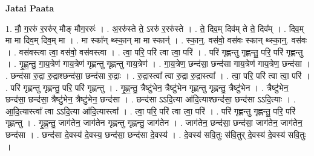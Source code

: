 \documentclass[17pt]{extarticle}
\begin{document}
\textbf{Jatai Paata} \newline

1. मौ॒ ग॒ररु॑ र॒ररु॑र् मौङ् मौग॒ररुः॑ । . अ॒ररु॑स्ते ते॒ ऽररु॑ र॒ररु॑स्ते । . ते॒ दिव॒म् दिव॑म् ते ते॒ दिव᳚म् । . दिव॒म् मा मा दिव॒म् दिव॒म् मा । . मा स्का᳚न् थ्स्का॒न् मा मा स्कान्॑ । . स्का॒न्॒. वस॑वो॒ वस॑वः स्कान् थ्स्का॒न्॒. वस॑वः । . वस॑वस्त्वा त्वा॒ वस॑वो॒ वस॑वस्त्वा । . त्वा॒ परि॒ परि॑ त्वा त्वा॒ परि॑ । . परि॑ गृह्णन्तु गृह्णन्तु॒ परि॒ परि॑ गृह्णन्तु । . गृ॒ह्ण॒न्तु॒ गा॒य॒त्रेण॑ गाय॒त्रेण॑ गृह्णन्तु गृह्णन्तु गाय॒त्रेण॑ । . गा॒य॒त्रेण॒ छन्द॑सा॒ छन्द॑सा गाय॒त्रेण॑ गाय॒त्रेण॒ छन्द॑सा । . छन्द॑सा रु॒द्रा रु॒द्राश्छन्द॑सा॒ छन्द॑सा रु॒द्राः । . रु॒द्रास्त्वा᳚ त्वा रु॒द्रा रु॒द्रास्त्वा᳚ । . त्वा॒ परि॒ परि॑ त्वा त्वा॒ परि॑ । . परि॑ गृह्णन्तु गृह्णन्तु॒ परि॒ परि॑ गृह्णन्तु । . गृ॒ह्ण॒न्तु॒ त्रैष्टु॑भेन॒ त्रैष्टु॑भेन गृह्णन्तु गृह्णन्तु॒ त्रैष्टु॑भेन । . त्रैष्टु॑भेन॒ छन्द॑सा॒ छन्द॑सा॒ त्रैष्टु॑भेन॒ त्रैष्टु॑भेन॒ छन्द॑सा । . छन्द॑सा ऽऽदि॒त्या आ॑दि॒त्याश्छन्द॑सा॒ छन्द॑सा ऽऽदि॒त्याः । . आ॒दि॒त्यास्त्वा᳚ त्वा ऽऽदि॒त्या आ॑दि॒त्यास्त्वा᳚ । . त्वा॒ परि॒ परि॑ त्वा त्वा॒ परि॑ । . परि॑ गृह्णन्तु गृह्णन्तु॒ परि॒ परि॑ गृह्णन्तु । . गृ॒ह्ण॒न्तु॒ जाग॑तेन॒ जाग॑तेन गृह्णन्तु गृह्णन्तु॒ जाग॑तेन । . जाग॑तेन॒ छन्द॑सा॒ छन्द॑सा॒ जाग॑तेन॒ जाग॑तेन॒ छन्द॑सा । . छन्द॑सा दे॒वस्य॑ दे॒वस्य॒ छन्द॑सा॒ छन्द॑सा दे॒वस्य॑ । . दे॒वस्य॑ सवि॒तुः स॑वि॒तुर् दे॒वस्य॑ दे॒वस्य॑ सवि॒तुः । \newline
\end{document}
